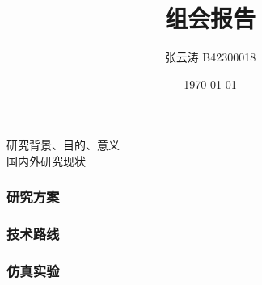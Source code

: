 \documentclass{beamer} %
\title{组会报告}
\author[张云涛]{\noindent 张云涛 B42300018}
\institute[HEU]{
	哈尔滨工程大学
}
\date{\today}
\begin{document}
\frame{\titlepage}

\begin{frame}
	研究背景、目的、意义 \\
	国内外研究现状
	
\end{frame}

\begin{frame}
	\frametitle{研究方案}
	
\end{frame}

\begin{frame}
	\frametitle{技术路线}
\end{frame}


\begin{frame}
	\frametitle{仿真实验}
	
\end{frame}
\end{document}
